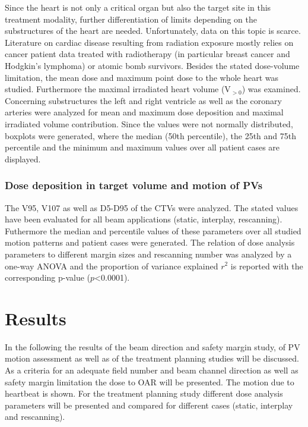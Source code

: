 \vspace*{-0.3cm}

Since the heart is not only a critical organ but also the target site in this treatment modality, further differentiation of 
limits depending on the substructures of the heart are needed. Unfortunately, data on this topic is scarce. Literature on cardiac disease 
resulting from radiation exposure mostly relies on cancer patient data treated with radiotherapy (in particular breast cancer and Hodgkin's 
lymphoma) or atomic bomb survivors. Besides the stated dose-volume limitation, the mean dose and maximum point dose to the whole heart was 
studied. Furthermore the maximal irradiated heart volume (V$_{>0}$) was examined. 
Concerning substructures the left and right ventricle as well as the coronary arteries were analyzed for mean and maximum dose deposition and 
maximal irradiated volume contribution. Since the values were not normally distributed, boxplots were generated, where the median (50th 
percentile), the 25th and 75th percentile and the minimum and maximum values over all patient cases are displayed. 

\subsubsection{Dose deposition in target volume and motion of PVs}

The V95, V107 as well as D5-D95 of the CTVs were analyzed. 
The stated values have been evaluated for all beam applications (static, interplay, rescanning). 
Futhermore the median and percentile values of these parameters over all studied motion patterns and patient cases were 
generated. The relation of dose analysis parameters to different margin sizes and rescanning number was analyzed by a one-way ANOVA and 
the proportion of variance explained $r^{2}$ is reported with the corresponding p-value ($p$<0.0001). 


\vspace*{-0.3cm}

\section{Results}

In the following the results of the beam direction and safety margin study, of PV motion assessment as well as of the treatment planning studies 
will be discussed. As a criteria for an adequate field number and beam channel direction as well as safety margin limitation the dose to OAR 
will be presented. The motion due to heartbeat is shown. For the treatment planning study different dose analysis parameters will be presented 
and compared for different cases (static, interplay and rescanning). 

